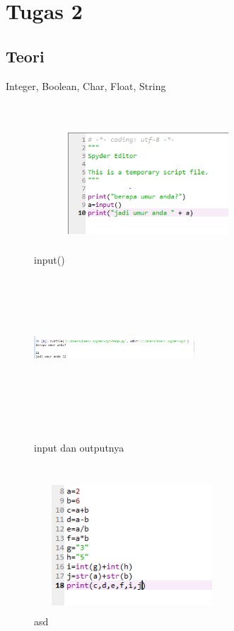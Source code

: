 \section{Tugas 2}
\subsection{Teori}
\begin{enumerate}
\item Integer, Boolean, Char, Float, String
\begin{figure}
\item input()
\centering
\includegraphics[width=6cm,height=6cm]{figures/c1.png}
\includegraphics[width=6cm,height=6cm]{figures/c2.png}
\caption {input dan outputnya}
\end{figure}
\begin{figure}
\item asd
\centering
\includegraphics[width=6cm,height=6cm]{figures/c3.png}

\end{figure}
\end{enumerate}
